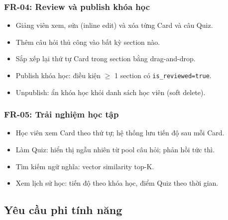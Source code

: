 \subsubsection{FR-04: Review và publish khóa học}

\begin{itemize}
    \item Giảng viên xem, sửa (inline edit) và xóa từng Card và câu Quiz.
    \item Thêm câu hỏi thủ công vào bất kỳ section nào.
    \item Sắp xếp lại thứ tự Card trong section bằng drag-and-drop.
    \item Publish khóa học: điều kiện $\geq$ 1 section có \texttt{is\_reviewed=true}.
    \item Unpublish: ẩn khóa học khỏi danh sách học viên (soft delete).
\end{itemize}

\subsubsection{FR-05: Trải nghiệm học tập}

\begin{itemize}
    \item Học viên xem Card theo thứ tự; hệ thống lưu tiến độ sau mỗi Card.
    \item Làm Quiz: hiển thị ngẫu nhiên từ pool câu hỏi; phản hồi tức thì.
    \item Tìm kiếm ngữ nghĩa: vector similarity top-K.
    \item Xem lịch sử học: tiến độ theo khóa học, điểm Quiz theo thời gian.
\end{itemize}

\subsection{Yêu cầu phi tính năng}

